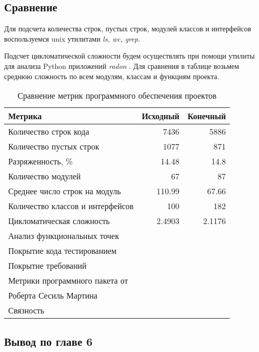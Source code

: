     \subsection{Сравнение}
    Для подсчета количества строк, пустых строк, модулей классов и интерфейсов
    воспользуемся unix утилитами \textit{ls, wc, grep}.

    Подсчет цикломатической сложности будем осуществлять при помощи утилиты для
    анализа Python приложений \textit{radon} \cite{complexity.radon}.
    Для сравнения в таблице возьмем среднюю сложность по всем модулям, классам
    и функциям проекта.
    
    \begin{table}[H]
        \caption{Сравнение метрик программного обеспечения проектов}
        \begin{center}
            \begin{tabular}{l|r|r}
                \textbf{Метрика} & \textbf{Исходный} & \textbf{Конечный} \\
                \hline
                Количество строк кода               & 7436 & 5886 \\
                Количество пустых строк             & 1077 & 871 \\
                Разряженность, \%                   & 14.48 & 14.8 \\
                Количество модулей                  & 67 & 87 \\
                Среднее число строк на модуль       & 110.99 & 67.66 \\
                Количество классов и интерфейсов    & 100 & 182 \\
                Цикломатическая сложность           & 2.4903 & 2.1176 \\
                Анализ функциональных точек         & & \\
                Покрытие кода тестированием         & & \\
                Покрытие требований                 & & \\
                Метрики программного пакета от      & & \\
                Роберта Сесиль Мартина              & & \\
                Связность                           & & \\
            \end{tabular}
        \end{center}
    \end{table}

    \subsection*{Вывод по главе 6}

